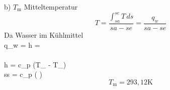 b) $T_{\text{m}}$ Mitteltemperatur \\
\[
T = \frac{\int_{sa}^{se} T \, ds}{sa-se} = \frac{q_w}{sa-se}
\]
Da Wasser im Kühlmittel \\
\hspace{1cm} \downarrow q_w = \Delta h \rightarrow {} =  \\
\hspace{1cm}  \\
\hspace{1cm} \rightarrow \Delta h = c_p (T_{} - T_{}) \\
\hspace{1cm} \rightarrow ss = c_p \ln \left(  \right) \\
\[
T_{\text{m}} = 293,12 \text{K}
\]